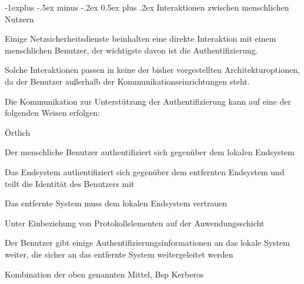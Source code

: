 \documentclass[a4paper]{article}
\makeatletter
\renewcommand{\subsection}{\@startsection{subsection}{2}{0mm}%
 {-1explus -.5ex minus -.2ex}%
 {0.5ex plus .2ex}%
 {\normalfont\normalsize\bfseries}}
\makeatother
\begin{document}
\begin{multicols}{3}
      \subsection{Interaktionen zwischen menschlichen Nutzern}
      \begin{itemize*}
            \item Einige Netzsicherheitsdienste beinhalten eine direkte Interaktion mit einem menschlichen Benutzer, der wichtigste davon ist die Authentifizierung.
            \item Solche Interaktionen passen in keine der bisher vorgestellten Architekturoptionen, da der Benutzer außerhalb der Kommunikationseinrichtungen steht.
            \item Die Kommunikation zur Unterstützung der Authentifizierung kann auf eine der folgenden Weisen erfolgen:
            \begin{itemize*}
                  \item Örtlich
                  \begin{itemize*}
                        \item Der menschliche Benutzer authentifiziert sich gegenüber dem lokalen Endsystem
                        \item Das Endsystem authentifiziert sich gegenüber dem entfernten Endsystem und teilt die Identität des Benutzers mit
                        \item Das entfernte System muss dem lokalen Endsystem vertrauen
                  \end{itemize*}
                  \item Unter Einbeziehung von Protokollelementen auf der Anwendungsschicht
                  \begin{itemize*}
                        \item Der Benutzer gibt einige Authentifizierungsinformationen an das lokale System weiter, die sicher an das entfernte System weitergeleitet werden
                  \end{itemize*}
                  \item Kombination der oben genannten Mittel, Bsp Kerberos
            \end{itemize*}
      \end{itemize*}


\end{multicols}
\end{document}
